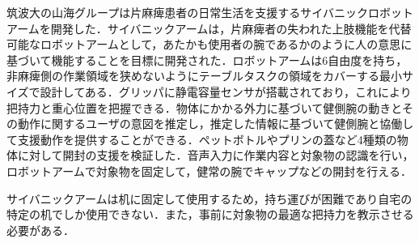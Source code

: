 筑波大の山海グループは片麻痺患者の日常生活を支援するサイバニックロボットアームを開発した\cite{Sankai2017, Sankai2019}．サイバニックアームは，片麻痺者の失われた上肢機能を代替可能なロボットアームとして，あたかも使用者の腕であるかのように人の意思に基づいて機能することを目標に開発された．ロボットアームは6自由度を持ち，非麻痺側の作業領域を狭めないようにテーブルタスクの領域をカバーする最小サイズで設計してある．グリッパに静電容量センサが搭載されており，これにより把持力と重心位置を把握できる．物体にかかる外力に基づいて健側腕の動きとその動作に関するユーザの意図を推定し，推定した情報に基づいて健側腕と協働して支援動作を提供することができる．ペットボトルやプリンの蓋など4種類の物体に対して開封の支援を検証した．音声入力に作業内容と対象物の認識を行い，ロボットアームで対象物を固定して，健常の腕でキャップなどの開封を行える．

サイバニックアームは机に固定して使用するため，持ち運びが困難であり自宅の特定の机でしか使用できない．また，事前に対象物の最適な把持力を教示させる必要がある．

